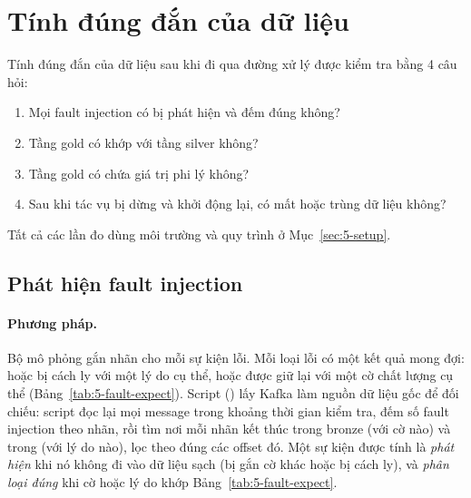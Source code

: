 \section{Tính đúng đắn của dữ liệu}
\label{sec:5-correctness}

Tính đúng đắn của dữ liệu sau khi đi qua đường xử lý được kiểm tra bằng 4 câu hỏi:

\begin{enumerate}
  \item Mọi fault injection có bị phát hiện và đếm đúng không?
  \item Tầng gold có khớp với tầng silver không?
  \item Tầng gold có chứa giá trị phi lý không?
  \item Sau khi tác vụ bị dừng và khởi động lại, có mất hoặc trùng dữ liệu không?
\end{enumerate}

Tất cả các lần đo dùng môi trường và quy trình ở Mục~\ref{sec:5-setup}.

\subsection{Phát hiện fault injection}
\label{sec:5-fault-detection}

\paragraph{Phương pháp.} Bộ mô phỏng gắn nhãn  cho mỗi sự kiện lỗi. Mỗi loại lỗi có một kết quả mong đợi: hoặc bị cách ly với một lý do cụ thể, hoặc được giữ lại với một cờ chất lượng cụ thể (Bảng~\ref{tab:5-fault-expect}). Script  () lấy Kafka làm nguồn dữ liệu gốc để đối chiếu: script đọc lại mọi message trong khoảng thời gian kiểm tra, đếm số fault injection theo nhãn, rồi tìm nơi mỗi nhãn kết thúc trong bronze (với cờ nào) và trong  (với lý do nào), lọc theo đúng các offset đó. Một sự kiện được tính là \emph{phát hiện} khi nó không đi vào dữ liệu sạch (bị gắn cờ khác  hoặc bị cách ly), và \emph{phân loại đúng} khi cờ hoặc lý do khớp Bảng~\ref{tab:5-fault-expect}.

